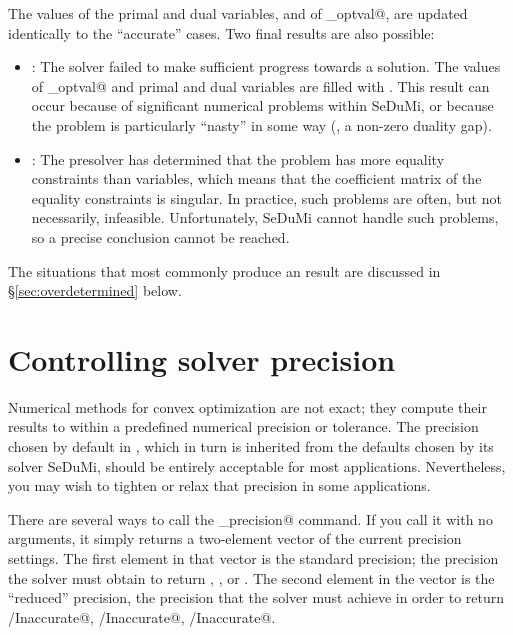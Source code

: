 \documentclass[12pt]{article}
\begin{document}
The values of the primal and dual variables, and of \verb@cvx_optval@, are updated
identically to the ``accurate'' cases. Two final results are also possible:
\begin{itemize}
	\item \verb@Failed@: The solver failed to make sufficient progress towards
	      a solution. The values of \verb@cvx_optval@ and primal and dual
	      variables are filled with \verb@NaN@s. This result can occur because
	      of significant numerical problems within SeDuMi, or because the problem
	      is particularly ``nasty'' in some way (\eg, a non-zero duality gap).
	\item \verb@Overdetermined@: The presolver has determined that the problem
	      has more equality constraints than variables, which means that the coefficient
	      matrix of the equality constraints is singular. In practice, such problems are
	      often, but not necessarily, infeasible. Unfortunately, SeDuMi 
	      cannot handle such problems, so a precise conclusion
	      cannot be reached.
\end{itemize}
The situations that most commonly produce an \verb@Overdetermined@ result are discussed
in \S\ref{sec:overdetermined} below.

\section{Controlling solver precision}

Numerical methods for convex optimization are not exact; they compute their results
to within a predefined numerical precision or tolerance. The precision chosen by default in \cvx,
which in turn is inherited from the defaults chosen by its solver SeDuMi, should
be entirely acceptable for most applications. Nevertheless, you may wish to tighten
or relax that precision in some applications.

There are several ways to call the \verb@cvx_precision@ command. If you call it with no arguments,
it simply returns a two-element vector of the current precision settings. The first element
in that vector is the standard precision; the precision the solver must obtain to return
\verb@Solved@, \verb@Unbounded@, or \verb@Infeasible@. The second element in the vector is
the ``reduced'' precision, the precision that the solver must achieve in order to
return \verb@Solved/Inaccurate@, \verb@Unbounded/Inaccurate@, \verb@Infeasible/Inaccurate@.
\end{document}
